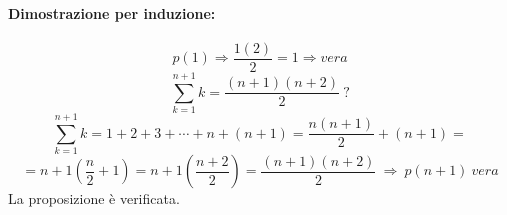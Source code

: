 \documentclass{article}
\begin{document}
            \paragraph{Dimostrazione per induzione: \\}
            \begin{equation}
                p(1) \Rightarrow \frac{1(2)}{2} = 1 \Rightarrow vera
            \end{equation}
            \begin{equation}
                    \sum_{k=1}^{n+1}k = \frac{(n+1)(n+2)}{2}\ ?
            \end{equation}
            \begin{equation*}
                \sum_{k=1}^{n+1}k = 1+2+3+\cdots+n+(n+1) = \frac{n(n+1)}{2}+(n+1)=
            \end{equation*}
            \begin{equation*}
                =n+1(\frac{n}{2}+1)=n+1(\frac{n+2}{2})=\frac{(n+1)(n+2)}{2}\ \Rightarrow\ p(n+1)\ vera
            \end{equation*}
            \hfill \break
            La proposizione è verificata.
\end{document}
